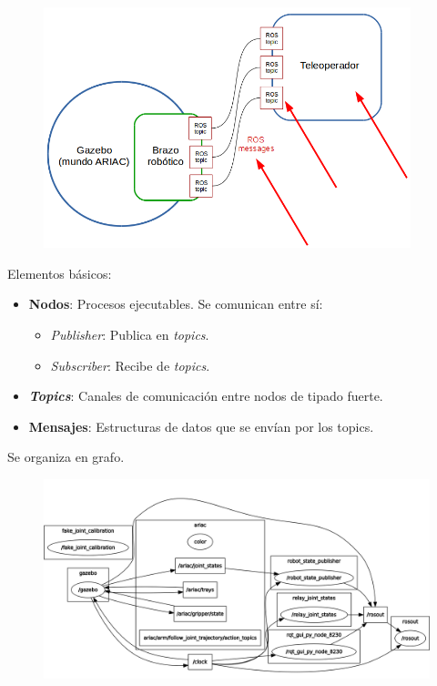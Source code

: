 \documentclass[notes,slidesec,a4]{seminar}
\begin{document}
\begin{hslide}
	\begin{center}
		\begin{figure}
			\includegraphics[width=0.95\textwidth]{graficobrazo.png}
		\end{figure}
	\end{center}
\end{hslide}

\begin{hslide}
	Elementos básicos:
	\begin{itemize}
		\item \textbf{Nodos}: Procesos ejecutables. Se comunican entre sí:
		\begin{itemize}
			\item \textit{Publisher}: Publica en \textit{topics}.
			\item \textit{Subscriber}: Recibe de \textit{topics}.
		\end{itemize}
		\item \textbf{\textit{Topics}}: Canales de comunicación entre nodos de tipado fuerte. 
		\item \textbf{Mensajes}: Estructuras de datos que se envían por los topics.
	\end{itemize}
	Se organiza en grafo.
\end{hslide}


\begin{hslide}
	\begin{center}
		\begin{figure}
			\includegraphics[width=\textwidth]{Brazo10.png}
		\end{figure}
	\end{center}
\end{hslide}
\end{document}
